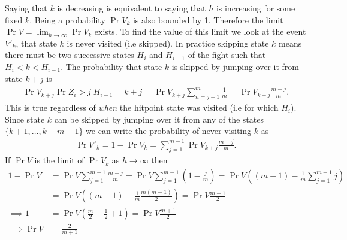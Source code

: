 Saying that $k$ is decreasing is equivalent to saying that $h$ is increasing for some fixed $k$. Being a probability $\Pr{V_k}$ is also bounded by 1. Therefore the limit $\Pr{V} = \lim_{h \rightarrow \infty}\Pr{V_{k}}$ exists. To find the value of this limit we look at the event $V'_k$, that state $k$ is never visited (i.e skipped). In practice skipping state $k$ means there must be two successive states $H_i$ and $H_{i-1}$ of the fight such that $H_{i} < k < H_{i-1}$. The probability that state $k$ is skipped by jumping over it from state $k+j$ is
\begin{align}
    \Pr{V_{k+j}}\Pr{Z_i > j | H_{i-1} = k+j} = \Pr{V_{k+j}}\sum_{n=j+1}^{m}\frac{1}{m} = \Pr{V_{k+j}}\frac{m-j}{m}.
\end{align}
This is true regardless of \textit{when} the hitpoint state was visited (i.e for which $H_i$). Since state $k$ can be skipped by jumping over it from any of the states $\{k+1,\ldots,k+m-1\}$ we can write the probability of never visiting $k$ as
\begin{align}
    \Pr{V'_k} = 1-\Pr{V_{k}} = \sum_{j=1}^{m-1}\Pr{V_{k+j}}\frac{m-j}{m}.
\end{align}
If $\Pr{V}$ is the limit of $\Pr{V_k}$ as $h \rightarrow \infty$ then
\begin{align}
    1-\Pr{V} &= \Pr{V}\sum_{j=1}^{m-1}\frac{m-j}{m}
           = \Pr{V}\sum_{j=1}^{m-1}\left(1 - \frac{j}{m}\right)
           = \Pr{V}\left((m-1) - \frac{1}{m}\sum_{j=1}^{m-1}j\right)\nonumber\\
           &= \Pr{V}\left((m-1) - \frac{1}{m}\frac{m(m-1)}{2}\right)
           = \Pr{V}\frac{m-1}{2}\nonumber\\
    \implies 1 &= \Pr{V}\left(\frac{m}{2} - \frac{1}{2} + 1\right) = \Pr{V}\frac{m+1}{2}\nonumber\\
    \implies \Pr{V} &= \frac{2}{m+1}\label{eq:visitproblimit}
\end{align}


